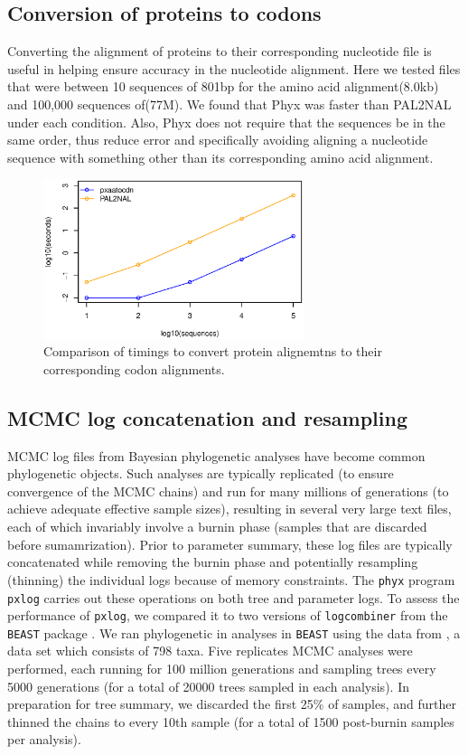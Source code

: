 \documentclass{article}
\begin{document}
\subsection{Conversion of proteins to codons}
Converting the alignment of proteins to their corresponding nucleotide file is useful in helping ensure accuracy in the nucleotide alignment. Here we tested files that were between 10 sequences of 801bp for the amino acid alignment(8.0kb) and 100,000 sequences of(77M). We found that Phyx was faster than PAL2NAL\cite{Suyama2006} under each condition. Also, Phyx does not require that the sequences be in the same order, thus reduce error and specifically avoiding aligning a nucleotide sequence with something other than its corresponding amino acid alignment.

\begin{figure}[h]
    \centering
    \includegraphics[width=3.0in]{aatocdn}
    \caption{Comparison of timings to convert protein alignemtns to
    their corresponding codon alignments.}
    \label{proteincodonfigure}
\label{fig:S2}
\end{figure}

\subsection{MCMC log concatenation and resampling}
MCMC log files from Bayesian phylogenetic analyses have become common phylogenetic objects. Such analyses are typically replicated (to ensure convergence of the MCMC chains) and run for many millions of generations (to achieve adequate effective sample sizes), resulting in several very large text files, each of which invariably involve a burnin phase (samples that are discarded before sumamrization). Prior to parameter summary, these log files are typically concatenated while removing the burnin phase and potentially resampling (thinning) the individual logs because of memory constraints. The \texttt{phyx} program \texttt{pxlog} carries out these operations on both tree and parameter logs. To assess the performance of \texttt{pxlog}, we compared it to two versions of \texttt{logcombiner} from the \texttt{BEAST} package \citep{DrummondRambaut2007,Bouckaert2014}. We ran phylogenetic in analyses in \texttt{BEAST} using the data from \cite{Magallon2015}, a data set which consists of 798 taxa. Five replicates MCMC analyses were performed, each running for 100 million generations and sampling trees every 5000 generations (for a total of 20000 trees sampled in each analysis). In preparation for tree summary, we discarded the first 25\% of samples, and further thinned the chains to every 10th sample (for a total of 1500 post-burnin samples per analysis).
\end{document}
